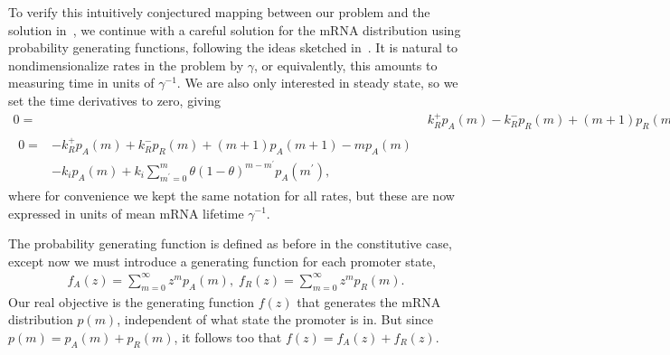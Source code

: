 To verify this intuitively conjectured mapping between our problem and the
solution in~\cite{Shahrezaei2008}, we continue with a careful solution for the
mRNA distribution using probability generating functions, following the ideas
sketched in~\cite{Shahrezaei2008}. It is natural to nondimensionalize rates in
the problem by $\gamma$, or equivalently, this amounts to measuring time in
units of $\gamma^{-1}$. We are also only interested in steady state, so we set
the time derivatives to zero, giving
\begin{align}
0 =& k_R^+ p_A(m) - k_R^- p_R(m) + (m+1) p_R(m+1) - m p_R(m)
\\
\begin{split}
0 =& - k_R^+ p_A(m) + k_R^- p_R(m) + (m+1) p_A(m+1) - m p_A(m) 
\\
&- k_i p_A(m) + k_i \sum_{m^\prime=0}^m \theta(1-\theta)^{m-m^\prime} p_A(m^\prime),
\end{split}
\end{align}
where for convenience we kept the same notation for all rates, but these are
now expressed in units of mean mRNA lifetime $\gamma^{-1}$.
        
The probability generating function is defined as before in the constitutive
case, except now we must introduce a generating function for each promoter
state,
\begin{align}
f_A(z) = \sum_{m=0}^\infty z^m p_A(m),
\;
f_R(z) = \sum_{m=0}^\infty z^m p_R(m).
\end{align}
Our real objective is the generating function $f(z)$ that generates the mRNA
distribution $p(m)$, independent of what state the promoter is in. But since
$p(m) = p_A(m) + p_R(m)$, it follows too that $f(z) = f_A(z) + f_R(z)$.

